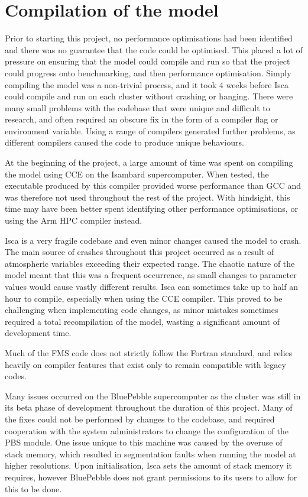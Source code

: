 \documentclass[a4paper,11pt]{report}
\begin{document}
\section{Compilation of the model}
Prior to starting this project, no performance optimisations had been identified and there was no guarantee that the code could be optimised. This placed a lot of pressure on ensuring that the model could compile and run so that the project could progress onto benchmarking, and then performance optimisation. Simply compiling the model was a non-trivial process, and it took 4 weeks before Isca could compile and run on each cluster without crashing or hanging. There were many small problems with the codebase that were unique and difficult to research, and often required an obscure fix in the form of a compiler flag or environment variable. Using a range of compilers generated further problems, as different compilers caused the code to produce unique behaviours.
\par
At the beginning of the project, a large amount of time was spent on compiling the model using CCE on the Isambard supercomputer. When tested, the executable produced by this compiler provided worse performance than GCC and was therefore not used throughout the rest of the project. With hindsight, this time may have been better spent identifying other performance optimisations, or using the Arm HPC compiler instead.
\par
Isca is a very fragile codebase and even minor changes caused the model to crash. The main source of crashes throughout this project occurred as a result of atmospheric variables exceeding their expected range. The chaotic nature of the model meant that this was a frequent occurrence, as small changes to parameter values would cause vastly different results. Isca can sometimes take up to half an hour to compile, especially when using the CCE compiler. This proved to be challenging when implementing code changes, as minor mistakes sometimes required a total recompilation of the model, wasting a significant amount of development time. 
\par
Much of the FMS code does not strictly follow the Fortran standard, and relies heavily on compiler features that exist only to remain compatible with legacy codes.
\par
Many issues occurred on the BluePebble supercomputer as the cluster was still in its beta phase of development throughout the duration of this project. Many of the fixes could not be performed by changes to the codebase, and required cooperation with the system administrators to change the configuration of the PBS module. One issue unique to this machine was caused by the overuse of stack memory, which resulted in segmentation faults when running the model at higher resolutions. Upon initialisation, Isca sets the amount of stack memory it requires, however BluePebble does not grant permissions to its users to allow for this to be done.
\end{document}
